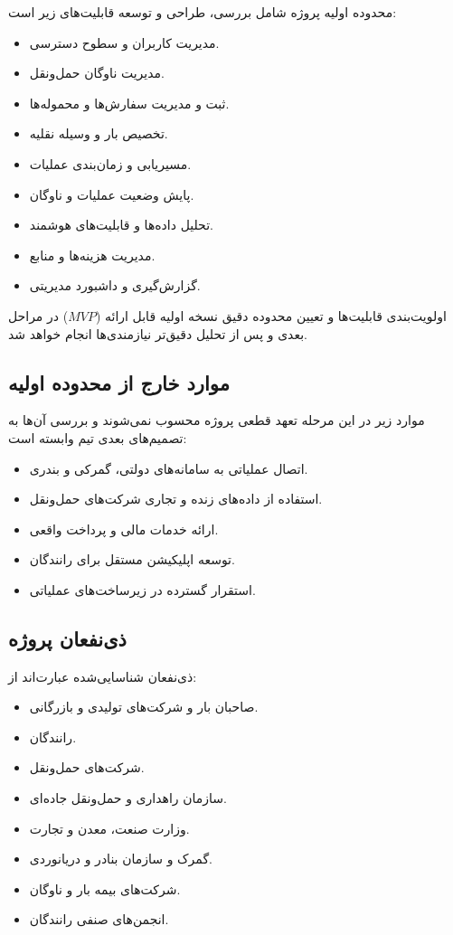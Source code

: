 \documentclass[12pt,a4paper]{article}
\begin{document}
	محدوده اولیه پروژه شامل بررسی، طراحی و توسعه
	قابلیت‌های زیر است:
	
	\begin{itemize}
		\item مدیریت کاربران و سطوح دسترسی.
		\item مدیریت ناوگان حمل‌ونقل.
		\item ثبت و مدیریت سفارش‌ها و محموله‌ها.
		\item تخصیص بار و وسیله نقلیه.
		\item مسیریابی و زمان‌بندی عملیات.
		\item پایش وضعیت عملیات و ناوگان.
		\item تحلیل داده‌ها و قابلیت‌های هوشمند.
		\item مدیریت هزینه‌ها و منابع.
		\item گزارش‌گیری و داشبورد مدیریتی.
	\end{itemize}
	
	اولویت‌بندی قابلیت‌ها و تعیین محدوده دقیق
	نسخه اولیه قابل ارائه ($MVP$) در مراحل بعدی
	و پس از تحلیل دقیق‌تر نیازمندی‌ها انجام خواهد شد.
	
	\subsection{موارد خارج از محدوده اولیه}
	
	موارد زیر در این مرحله تعهد قطعی پروژه
	محسوب نمی‌شوند و بررسی آن‌ها به تصمیم‌های
	بعدی تیم وابسته است:
	
	\begin{itemize}
		\item اتصال عملیاتی به سامانه‌های دولتی،
		گمرکی و بندری.
		\item استفاده از داده‌های زنده و تجاری
		شرکت‌های حمل‌ونقل.
		\item ارائه خدمات مالی و پرداخت واقعی.
		\item توسعه اپلیکیشن مستقل برای رانندگان.
		\item استقرار گسترده در زیرساخت‌های عملیاتی.
	\end{itemize}
	
	\subsection{ذی‌نفعان پروژه}
	
	ذی‌نفعان شناسایی‌شده عبارت‌اند از:
	
	\begin{itemize}
		\item صاحبان بار و شرکت‌های تولیدی و بازرگانی.
		\item رانندگان.
		\item شرکت‌های حمل‌ونقل.
		\item سازمان راهداری و حمل‌ونقل جاده‌ای.
		\item وزارت صنعت، معدن و تجارت.
		\item گمرک و سازمان بنادر و دریانوردی.
		\item شرکت‌های بیمه بار و ناوگان.
		\item انجمن‌های صنفی رانندگان.
	\end{itemize}
	
\end{document}
